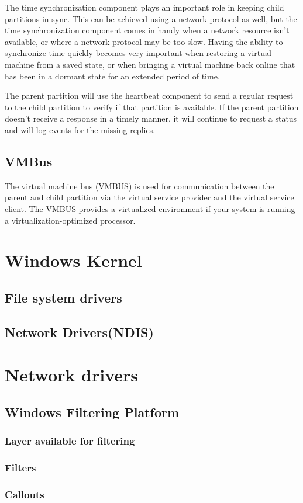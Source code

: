 \vspace{5mm}

The time synchronization component plays an important role in keeping child partitions in sync. This can be achieved using a network protocol as well, but the time synchronization component comes in handy when a network resource isn’t available, or where a network protocol may be too slow. Having the ability to synchronize time quickly becomes
very important when restoring a virtual machine from a saved state, or when bringing a virtual machine back online that has been in a dormant state for an extended period of time.

\vspace{5mm}

The parent partition will use the heartbeat component to send a regular request to the child partition to verify if that partition is available. If the parent partition doesn’t
receive a response in a timely manner, it will continue to request a status and will log
events for the missing replies.

\subsection{VMBus}

\vspace{5mm}

The virtual machine bus (VMBUS) is used for communication between the parent and child partition via the virtual service provider and the virtual service client. The VMBUS
provides a virtualized environment if your system is running a virtualization-optimized processor.

\vspace{5mm}

\section{Windows Kernel}
\subsection{File system drivers}
\subsection{Network Drivers(NDIS)}
\section{Network drivers}
\subsection{Windows Filtering Platform}
\subsubsection{Layer available for filtering}
\subsubsection{Filters}
\subsubsection{Callouts}

